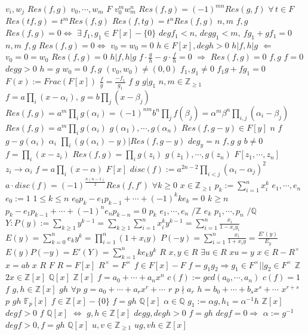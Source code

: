 \documentclass{article}
\begin{document}
$v_i,w_j$
$Res(f,g)$
$v_0, \cdots,w_m$
$F$
$v_0^mw_m^n$
$Res(f,g)=(-1)^{mn}Res(g,f)$
$\forall\, t \in F$
$Res(tf,g)=t^mRes(f,g)$
$Res(f,tg)=t^nRes(f,g)$
$n,m$
$f,g$
$Res(f,g)=0 \Longleftrightarrow$
$\exists\,f_1,g_1 \in F[x]-\{0\}$
$degf_1<n,\,degg_1<m,\ fg_1+gf_1=0$
$n,m$
$f,g$
$Res(f,g)=0 \Longleftrightarrow$
$v_0=w_0=0$
$h \in F[x],degh>0$
$h|f,h|g$
$\Longleftarrow$
$v_0=0=w_0$
$Res(f,g)=0$
$h|f,h|g$
$f \cdot \frac{g}{h}-g \cdot \frac{f}{h}=0$
$\Longrightarrow$
$Res(f,g)=0$
$f,g$
$f=0$
$degg>0$
$h=g$
$w_0=0$
$f,g$
$(v_0,w_0) \neq (0,0)$
$f_1,g_1 \neq 0$
$f_1g+fg_1=0$
$F(x):=Frac(F[x])$
$\frac{f}{g}=\frac{-f_1}{g_1}$
$f$
$g$
$g|g_1$
$n,m \in \mathbb{Z}_{\geq 1}$
$f=a\prod_i(x-\alpha_i),\,g=b\prod_j(x-\beta_j)$
$Res(f,g)=a^m\prod_ig(\alpha_i)=(-1)^{nm}b^n\prod_jf(\beta_j)=\alpha^m\beta^n\prod_{i,j}(\alpha_i-\beta_j)$
$Res(f,g)=a^m\prod_ig(\alpha_i)$
$g(\alpha_1),\cdots,g(\alpha_n)$
$Res(f,g-y) \in F[y]$
$n$
$f$
$g-g(\alpha_i)$
$\alpha_i$
$\prod_i(g(\alpha_i)-y)|Res(f,g-y)$
$deg_y=n$
$f,g$
$g$
$b \neq 0$
$f=\prod_i(x-z_i)$
$Res(f,g)=\prod_ig(z_i)$
$g(z_1),\cdots,g(z_n)$
$F[z_1,\cdots,z_n]$
$z_i \rightarrow \alpha_i$
$f=a \prod_i(x-\alpha)$
$F[x]$
$disc(f):=a^{2n-2}\prod_{i<j}(\alpha_i-\alpha_j)^2$
$a \cdot disc(f)=(-1)^{\frac{n(n-1)}2}Res(f,f')$
$\forall k \geq 0$
$x \in \mathbb{Z}_{\geq 1}$
$p_k:=\sum_{i=1}^nx_i^k$
$e_1,\cdots,e_n$
$e_0:=1$
$1 \leq k \leq n$
$e_0p_k-e_1p_{k-1}+ \cdots+(-1)^kke_k=0$
$k \geq n$
$p_k-e_1p_{k-1}+ \cdots+(-1)^ne_np_{k-n}=0$
$p_k$
$e_1,\cdots,e_n$
$/\mathbb{Z}$
$e_k$
$p_1,\cdots,p_n$
$/\mathbb{Q}$
$Y:P(y):=\sum_{k \geq 1}y^{k-1}=\sum_{k \geq 1}\sum_{i=1}^nx_i^ky^{k-1}=\sum_{i=1}^n\frac{x_i}{1-x_iy_i}$
$E(y)=\sum_{k=0}^{n}e_ky^k=\prod_{i=1}^n(1+x_iy)$
$P(-y)=\sum_{i=1}^n\frac{x_i}{1+x_iy}=\frac{E'(y)}{E_y}$
$E(y)P(-y)=E'(Y)=\sum_{k=1}^nke_ky^k$
$R$
$x,y \in R$
$\exists u \in R$
$xu=y$
$x \in R-R^\times$
$x=ab$
$x$
$R$
$F$
$R=F[x]$
$R^\times=F^\times$
$f \in F[x]-F$
$f=g_1g_2 \Rightarrow g_1 \in F^\times || g_2 \in F^\times$
$\mathbb{Z}$
$2x \in \mathbb{Z}[x]$
$\mathbb{Q}[x]$
$\mathbb{Z}[x]$
$f=a_0+ \cdots+a_nx^n$
$c(f):=gcd(a_0,\cdots,a_n)$
$c(f)=1$
$f$
$g,h \in \mathbb{Z}[x]$
$gh$
$\forall p$
$g=a_0+\cdots+a_rx^r+\cdots$
$r$
$p \nmid a_r$
$h=b_0+\cdots+b_sx^s+\cdots$
$x^{r+s}$
$p$
$gh$
$\mathbb{F}_p[x]$
$f \in \mathbb{Z}[x]-\{0\}$
$f=gh$
$\mathbb{Q}[x]$
$\alpha \in \mathbb{Q}$
$g_1:=\alpha g,h_1=\alpha^{-1}h$
$\mathbb{Z}[x]$
$degf >0$
$f$
$\mathbb{Q}[x]$
$\Leftrightarrow$
$g,h \in \mathbb{Z}[x]$
$degg,degh>0$
$f=gh$
$degf=0 \Rightarrow$
$\alpha:=g^{-1}$
$degf>0,f=gh$
$\mathbb{Q}[x]$
$u,v \in \mathbb{Z}_{\geq 1}$
$ug,vh \in \mathbb{Z}[x]$
\end{document}
